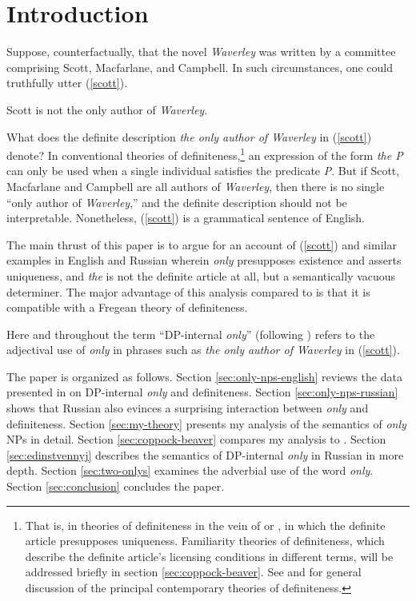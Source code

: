 \section{Introduction \label{sec:intro}}
Suppose, counterfactually, that the novel \textit{Waverley} was written by a committee comprising Scott, Macfarlane, and Campbell. In such circumstances, one could truthfully utter (\ref{scott}).

\begin{exe}
	\ex \label{scott} Scott is not the only author of \textit{Waverley}.\\
	\hspace*{\fill} \citep{cb2015}  %
\end{exe}

What does the definite description \textit{the only author of Waverley} in (\ref{scott}) denote? In conventional theories of definiteness,\footnote{That is, in theories of definiteness in the vein of \citet{frege} or \citet{strawson50}, in which the definite article presupposes uniqueness. Familiarity theories of definiteness, which describe the definite article's licensing conditions in different terms, will be addressed briefly in section \ref{sec:coppock-beaver}. See \citet[chap. 1]{schwarz09} and \citet{horn-abbott-2012} for general discussion of the principal contemporary theories of definiteness.} an expression of the form \textit{the P} can only be used when a single individual satisfies the predicate \textit{P}. But if Scott, Macfarlane and Campbell are all authors of \textit{Waverley}, then there is no single ``only author of \textit{Waverley},'' and the definite description should not be interpretable. Nonetheless, (\ref{scott}) is a grammatical sentence of English.

The main thrust of this paper is to argue for an account of (\ref{scott}) and similar examples in English and Russian wherein \textit{only} presupposes existence and asserts uniqueness, and \textit{the} is not the definite article at all, but a semantically vacuous determiner. The major advantage of this analysis compared to  is that it is compatible with a Fregean theory of definiteness.

Here and throughout the term ``DP-internal \textit{only}'' (following \citet{mcnally08}) refers to the adjectival use of \textit{only} in phrases such as \textit{the only author of Waverley} in (\ref{scott}).

The paper is organized as follows. Section \ref{sec:only-nps-english} reviews the data presented in \citet{cb2015} on DP-internal \textit{only} and definiteness. Section \ref{sec:only-nps-russian} shows that Russian also evinces a surprising interaction between \textit{only} and definiteness. Section \ref{sec:my-theory} presents my analysis of the semantics of \textit{only} NPs in detail. Section \ref{sec:coppock-beaver} compares my analysis to . Section \ref{sec:edinstvennyj} describes the semantics of DP-internal \textit{only} in Russian in more depth. Section \ref{sec:two-onlys} examines the adverbial use of the word \textit{only}. Section \ref{sec:conclusion} concludes the paper.
